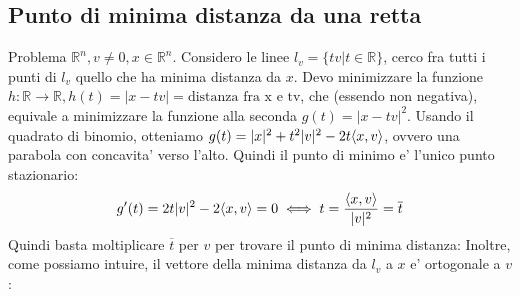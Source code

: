 \documentclass{report}
\begin{document}
\subsection{Punto di minima distanza da una retta}
Problema $ \mathbb{R}^n, v\neq 0, x \in \mathbb{R}^n $. Considero le linee $ l_v = \{tv|t\in\mathbb{R}\} $, cerco fra tutti i punti di $ l_v $ quello che ha minima distanza da $ x $. Devo minimizzare la funzione $ h:\mathbb{R}\to\mathbb{R}, h(t)=|x-tv| = \text{distanza fra x e tv} $, che (essendo non negativa), equivale a minimizzare la funzione alla seconda $ g(t) = |x-tv|^2 $. Usando il quadrato di binomio, otteniamo $ g(t) = |x|^2 + t^2|v|^2-2t \langle x, v \rangle $, ovvero una parabola con concavita' verso l'alto. Quindi il punto di minimo e' l'unico punto stazionario:
\[
  g'(t) = 2t|v|^2 -2 \langle x, v \rangle = 0 \iff t = \frac{\langle x, v \rangle}{|v|^2} = \overline{t}
\]
Quindi basta moltiplicare $ \overline{t} $ per $ v $ per trovare il punto di minima distanza:
Inoltre, come possiamo intuire, il vettore della minima distanza da $ l_v $ a $ x $ e' ortogonale a $ v $:
\end{document}
